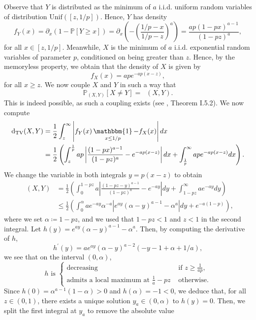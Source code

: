 \documentclass[11pt]{article}
\numberwithin{equation}{section}
\DeclareMathOperator{\indicatrice}{\mathbbm{1}}
\DeclareMathOperator{\tv}{d_{\mathrm{TV}}}
\theoremstyle{definition}
\newcommand\bP{{\mathbb P}}
\begin{document}
Observe that $Y$ is distributed as the minimum of $a$ i.i.d. uniform random variables of distribution $\textrm{Unif}([z,1/p])$. Hence, $Y$ has density 
$$f_Y(x) = \partial_x (1-\bP[Y \geq x]) = \partial_x \left(-\left( \frac{1/p - x}{1/p - z}\right)^{a}\right)= \frac{ap(1-px)^{a-1} }{(1-pz)^{a}}, $$
for all $x \in [z,1/p]$. Meanwhile, $X$ is the minimum of $a$ i.i.d. exponential random variables of parameter $p$, conditioned on being greater than $z$. Hence, by the memoryless property, we obtain that the density of $X$ is given by
$$f_X (x) = ape^{-ap(x-z)}, $$
for all $x \geq z$. We now couple $X$ and $Y$ in such a way that
$$ \bP_{(X,Y)}[X \neq Y ] = \tv(X,Y).$$
This is indeed possible, as such a coupling exists (see \cite{L92}, Theorem I.5.2). We now compute
\begin{equation*}
\begin{split}
\tv(X,Y) &= \frac{1}{2}\int_z^\infty \left| f_Y(x)\indicatrice_{x \leq 1/p} - f_X(x)\right|dx\\
&= \frac{1}{2}\left(\int_z^{\frac{1}{p}} ap\left|\frac{(1-px)^{a-1}}{(1-pz)^a} - e^{-ap(x-z)}  \right|dx + \int_{\frac{1}{p}}^\infty ap e^{-ap(x-z)}dx\right).
\end{split}
\end{equation*}
We change the variable in both integrals $y = p(x-z)$ to obtain
\begin{equation*}
\begin{split}
\tv(X,Y) &= \frac{1}{2}\left(\int_0^{1-pz} a\left|\frac{(1-pz-y)^{a-1}}{(1-pz)^a} - e^{-ay}  \right|dy + \int_{1-pz}^\infty a e^{-ay}dy\right)\\
&\leq \frac{1}{2}\left(\int_0^{\alpha} ae^{-ay}\alpha^{-a}\left|e^{ay}(\alpha-y)^{a-1} - \alpha^a \right|dy + e^{-a(1-p)}\right),
\end{split}
\end{equation*}
where we set $\alpha \coloneqq 1-pz$, and we used that $1-pz < 1$ and $z<1$ in the second integral. Let $h(y) = e^{ay}(\alpha-y)^{a-1} - \alpha^a$. Then, by computing the derivative of $h$, $$h^\prime(y) = ae^{ay} (\alpha-y)^{a-2}(-y-1+\alpha+1/a),$$ 
we see that on the interval $(0,\alpha)$, 
$$h \textrm{ is } \begin{cases} \textrm{decreasing } &\textrm{ if } z\geq \frac{1}{ap},\\
\textrm{admits a local maximum at }\frac{1}{a}-pz &\textrm{ otherwise.}\end{cases}$$
Since $h(0) = \alpha^{a-1}(1-\alpha) > 0$ and $h(\alpha) = -1 < 0$, we deduce that, for all $z\in (0,1)$, there exists a unique solution $y_a \in (0,\alpha)$ to $h(y)=0$. Then, we split the first integral at $y_a$ to remove the absolute value 
\end{document}
